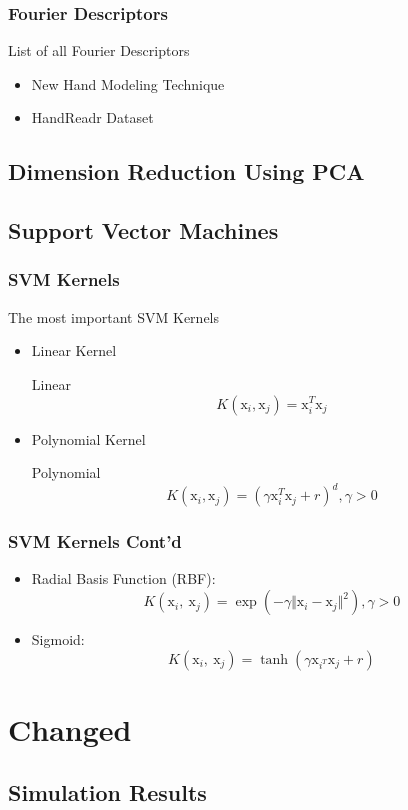 \documentclass{beamer}
\begin{document}
\begin{frame}
	\frametitle{Fourier Descriptors}
	List of all Fourier Descriptors
	
	\begin{itemize}
		\item<1-> New Hand Modeling Technique
		\item<2-> HandReadr Dataset
	\end{itemize}
\end{frame}

\subsection{Dimension Reduction Using PCA}
\subsection{Support Vector Machines}

\begin{frame}
	\frametitle{SVM Kernels}
	The most important SVM Kernels
		\begin{itemize}
		\item <1-> Linear Kernel
		\begin{block}{Linear} 
		\begin{equation}
		K(\mathrm{x}_{i},\mathrm{x}_{j})=\mathrm{x}_{i}^{T}\mathrm{x}_{j}
		\end{equation}
		\end{block}		

		\item <2-> Polynomial Kernel
		\begin{block}{Polynomial} 
		\begin{equation}
		K(\mathrm{x}_{i},\mathrm{x}_{j})=(\gamma\mathrm{x}_{i}^{T}\mathrm{x}_{j}+r)^{d}, \gamma>0
		\end{equation}
		\end{block}		
 		\end{itemize}
	
\end{frame}

\begin{frame}
	\frametitle{SVM Kernels Cont'd}
	\begin{itemize}
		\item  Radial Basis Function (RBF):
		\begin{equation}
		K(\mathrm{x}_{i},\ \mathrm{x}_{j})=\exp(-\gamma\Vert \mathrm{x}_{i}-\mathrm{x}_{j}\Vert^{2}), \gamma>0
		\end{equation}
		
		\item Sigmoid: 
		\begin{equation}
		K(\mathrm{x}_{i},\ \mathrm{x}_{j})=\tanh(\gamma \mathrm{x}_{i^{T}}\mathrm{x}_{j}+r)
		\end{equation}
	\end{itemize}

\end{frame}

\section{Changed}
\subsection{Simulation Results}
\end{document}
